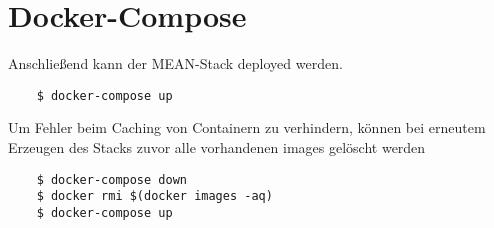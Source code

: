 \section{Docker-Compose}
Anschließend kann der MEAN-Stack deployed werden.

\begin{verbatim}
	$ docker-compose up
\end{verbatim}

Um Fehler beim Caching von Containern zu verhindern, können bei erneutem Erzeugen des Stacks zuvor alle vorhandenen images gelöscht werden

\begin{verbatim}
	$ docker-compose down
	$ docker rmi $(docker images -aq)
	$ docker-compose up
\end{verbatim} 